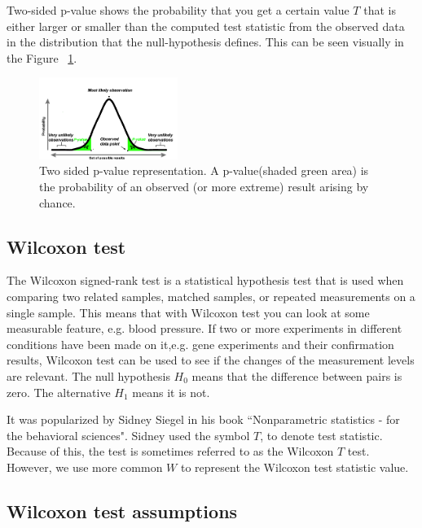\documentclass[12pt]{article}
\begin{document}
Two-sided p-value shows the probability that you get a certain value $T$ that is either larger or smaller than the computed test statistic from the observed data in the distribution that the null-hypothesis defines. This can be seen visually in the Figure ~\ref{fig:p_value_two_sided}.

\begin{figure}[H]
  \centering
  \includegraphics[width=0.4\textwidth]{p_value_two_sided}
  \caption{Two sided p-value representation. A p-value(shaded green area) is the probability of an observed (or more extreme) result arising by chance. ~\cite{p_value_pic_cite}}
  \label{fig:p_value_two_sided}
\end{figure}

\subsection{Wilcoxon test}

The Wilcoxon signed-rank test is a statistical hypothesis test that is used when comparing two related samples, matched samples, or repeated measurements on a single sample. This means that with Wilcoxon test you can look at some measurable feature, e.g. blood pressure. If two or more experiments in different conditions have been made on it,e.g. gene experiments and their confirmation results, Wilcoxon test can be used to see if the changes of the measurement levels are relevant. The null hypothesis $H_0$ means that the difference between pairs is zero. The alternative $H_1$ means it is not.

It was popularized by Sidney Siegel in his book ``Nonparametric statistics - for the behavioral sciences". Sidney used the symbol $T$, to denote test statistic. Because of this, the test is sometimes referred to as the Wilcoxon $T$ test. However, we use more common $W$ to represent the Wilcoxon test statistic value.

\subsection{Wilcoxon test assumptions}
\end{document}
